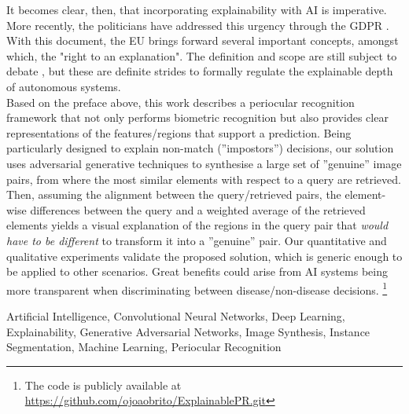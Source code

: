 \documentclass[11pt,twoside]{template/estiloUBI}
\newcommand\blfootnote[1]{%
  \begingroup
  \renewcommand\thefootnote{}\footnote{#1}%
  \addtocounter{footnote}{-1}%
  \endgroup
}
\begin{document}
It becomes clear, then, that incorporating explainability with \ac{AI} is imperative. More recently, the politicians have addressed this urgency through the \ac{GDPR} \cite{gdpr}. With this document, the \ac{EU} brings forward several important concepts, amongst which, the "right to an explanation". The definition and scope are still subject to debate \cite{right_to_explanation}, but these are definite strides to formally regulate the explainable depth of autonomous systems.\\

Based on the preface above, this work describes a periocular recognition framework that not only performs biometric recognition but also provides clear representations of the features/regions that support a prediction. Being particularly designed to explain non-match (''impostors'') decisions, our solution uses adversarial generative techniques to synthesise a large set of ''genuine'' image pairs, from where the most similar elements with respect to a query are retrieved. Then, assuming the alignment  between the query/retrieved pairs, the element-wise differences between the query and a weighted average of the retrieved elements yields a visual explanation of the regions in the query pair that \emph{would have to be different} to transform it into a ''genuine'' pair. Our quantitative and qualitative experiments validate the proposed solution, which is generic enough to be applied to other scenarios. Great benefits could arise from AI systems being more transparent when discriminating between disease/non-disease decisions. \blfootnote{The code is publicly available at \url{ https://github.com/ojoaobrito/ExplainablePR.git}}

\vspace{2.2cm}
{}
 
\vspace{0.8cm}

Artificial Intelligence, Convolutional Neural Networks, Deep Learning, Explainability, Generative Adversarial Networks, Image Synthesis, Instance Segmentation, Machine Learning, Periocular Recognition

\cleardoublepage


\tableofcontents





\listoffigures
\cleardoublepage	


\listoftables
\cleardoublepage


\newpage
\end{document}
